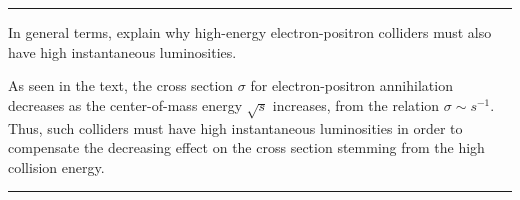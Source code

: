 \noindent\rule{7in}{1.5pt}


\begin{problem}{6.5}
    In general terms, explain why high-energy electron-positron colliders must also have high instantaneous luminosities.
\end{problem}
\begin{solution}
As seen in the text, the cross section $\sigma$ for electron-positron annihilation decreases as the center-of-mass energy $\sqrt{s}$ increases, from the relation $\sigma \sim s^{-1}$. Thus, such colliders must have high instantaneous luminosities in order to compensate the decreasing effect on the cross section stemming from the high collision energy.
\end{solution}

\noindent\rule{7in}{1.5pt}



